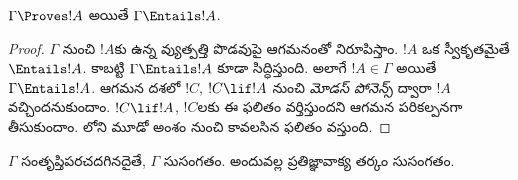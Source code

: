 \documentclass[../../../include/open-logic-section]{subfiles}
\begin{document}


\begin{thm}[నిర్దుష్టత]
$\Gamma\Proves!A$ అయితే $\Gamma \Entails !A$.
\end{thm}

\begin{proof}
$\Gamma$ నుంచి $!A$కు ఉన్న వ్యుత్పత్తి పొడవుపై ఆగమనంతో నిరూపిస్తాం. $!A$ ఒక స్వీకృతమైతే $\Entails !A$. కాబట్టి $\Gamma \Entails!A$ కూడా సిద్ధిస్తుంది. అలాగే $!A \in \Gamma$ అయితే $\Gamma \Entails!A$. ఆగమన దశలో $!C$, $!C\lif!A$ నుంచి \emph{మోడస్ పోనెన్స్} ద్వారా $!A$ వచ్చిందనుకుందాం. $!C\lif !A$, $!C$లకు ఈ ఫలితం వర్తిస్తుందని ఆగమన పరికల్పనగా తీసుకుందాం. లోని మూడో అంశం నుంచి కావలసిన ఫలితం వస్తుంది.
\end{proof}

\begin{cor}
$\Gamma$ సంతృప్తిపరచదగినదైతే, $\Gamma$ సుసంగతం. అందువల్ల ప్రతిజ్ఞావాక్య తర్కం సుసంగతం.
\end{cor}
\end{document}
